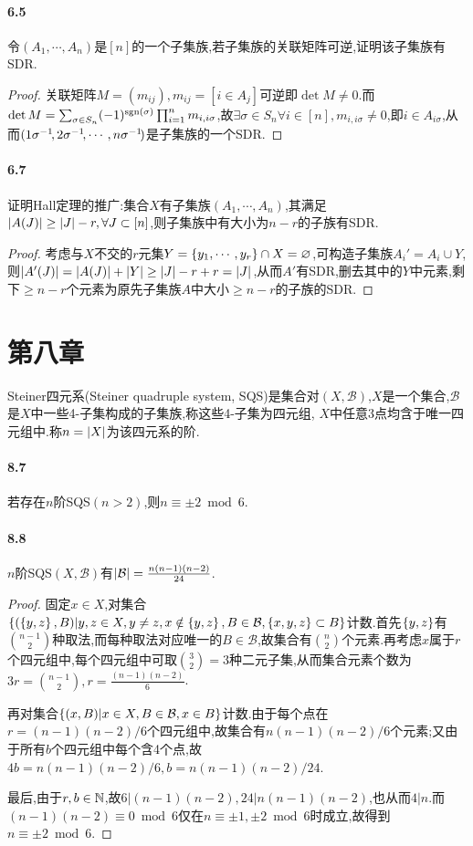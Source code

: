 \documentclass{article}
\begin{document}
\paragraph{6.5}令$(A_1,\cdots,A_n)$是$[n]$的一个子集族,若子集族的关联矩阵可逆,证明该子集族有SDR.
\begin{proof}
    关联矩阵$M=(m_{ij}), m_{ij}=[i\in A_j]$可逆即$\det M\neq 0$.而$\det M=\sum_{\sigma\in S_n}(-1)^{\operatorname{sgn}(\sigma)}\prod_{i=1}^{n}m_{i,i\sigma}$,故$\exists \sigma\in S_n\forall i\in [n], m_{i,i\sigma}\neq 0$,即$i\in A_{i\sigma}$,从而$(1\sigma^{-1}\!,2\sigma^{-1}\!,\cdots,n\sigma^{-1}\!)$是子集族的一个SDR.
\end{proof}

\paragraph{6.7}证明Hall定理的推广:集合$X$有子集族$(A_1,\cdots,A_n)$,其满足$\left|A(J)\right|\geq\left|J\right|-r, \forall J\subset [n]$,则子集族中有大小为$n-r$的子族有SDR.%
\begin{proof}
    考虑与$X$不交的$r$元集$Y=\left\{y_1,\cdots,y_r\right\}\cap X=\varnothing$,可构造子集族$A_i'=A_i\cup Y$,则$\left|A'(J)\right|=\left|A(J)\right|+\left|Y\right|\geq \left|J\right|-r+r=\left|J\right|$,从而$A'$有SDR,删去其中的$Y$中元素,剩下$\geq n-r$个元素为原先子集族$A$中大小$\geq n-r$的子族的SDR.
\end{proof}

\section{第八章}
Steiner四元系(Steiner quadruple system, SQS)是集合对$(X,\mathcal{B})$,$X$是一个集合,$\mathcal{B}$是$X$中一些4-子集构成的子集族,称这些4-子集为四元组, $X$中任意3点均含于唯一四元组中.称$n=\left|X\right|$为该四元系的阶.

\paragraph{8.7}若存在$n$阶SQS$(n>2)$,则$n\equiv \pm 2 \bmod 6$.

\paragraph{8.8}$n$阶SQS$(X,\mathcal{B})$有$\left|\mathcal{B}\right|=\frac{n(n-1)(n-2)}{24}$.
\begin{proof}
    固定$x\in X$,对集合$\left\{(\left\{y,z\right\},B)|y,z\in X, y\neq z, x\notin \left\{y,z\right\}, B\in \mathcal{B}, \left\{x,y,z\right\}\subset B\right\}$计数.首先$\left\{y,z\right\}$有$\binom{n-1}{2}$种取法,而每种取法对应唯一的$B\in \mathcal{B}$,故集合有$\binom{n}{2}$个元素.再考虑$x$属于$r$个四元组中,每个四元组中可取$\binom{3}{2}=3$种二元子集,从而集合元素个数为$3r=\binom{n-1}{2}, r=\frac{(n-1)(n-2)}{6}$.

    再对集合$\left\{(x,B)|x\in X, B\in \mathcal{B}, x\in B\right\}$计数.由于每个点在$r=(n-1)(n-2)/6$个四元组中,故集合有$n(n-1)(n-2)/6$个元素;又由于所有$b$个四元组中每个含4个点,故$4b=n(n-1)(n-2)/6, b=n(n-1)(n-2)/24$.

    最后,由于$r,b\in\mathbb{N}$,故$6|(n-1)(n-2), 24|n(n-1)(n-2)$,也从而$4|n$.而$(n-1)(n-2)\equiv 0\bmod 6$仅在$n\equiv\pm 1,\pm 2\bmod 6$时成立,故得到$n\equiv \pm 2\bmod 6$.
\end{proof}
\end{document}
